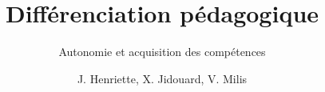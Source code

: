\documentclass[t,12pt]{beamer}
\title{Différenciation pédagogique}
\subtitle{Autonomie et acquisition des compétences}
\author{J. Henriette, X. Jidouard, V. Milis}
\date{\oldstylenums{07 Mai 2019}}
\begin{document}
\frame{\titlepage}





\end{document}
